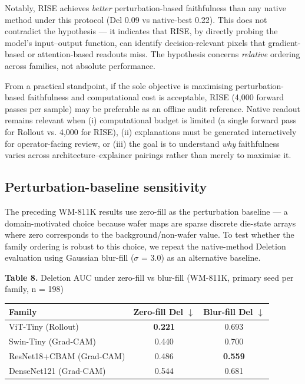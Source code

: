 \documentclass[11pt,a4paper]{article}
\begin{document}
Notably, RISE achieves \emph{better} perturbation-based faithfulness than any native method under this protocol (Del 0.09 vs native-best 0.22). This does not contradict the hypothesis --- it indicates that RISE, by directly probing the model's input--output function, can identify decision-relevant pixels that gradient-based or attention-based readouts miss. The hypothesis concerns \emph{relative} ordering across families, not absolute performance.

From a practical standpoint, if the sole objective is maximising perturbation-based faithfulness and computational cost is acceptable, RISE (4,000 forward passes per sample) may be preferable as an offline audit reference. Native readout remains relevant when (i) computational budget is limited (a single forward pass for Rollout vs. 4,000 for RISE), (ii) explanations must be generated interactively for operator-facing review, or (iii) the goal is to understand \emph{why} faithfulness varies across architecture--explainer pairings rather than merely to maximise it.


\subsection{Perturbation-baseline sensitivity}

The preceding WM-811K results use zero-fill as the perturbation baseline --- a domain-motivated choice because wafer maps are sparse discrete die-state arrays where zero corresponds to the background/non-wafer value. To test whether the family ordering is robust to this choice, we repeat the native-method Deletion evaluation using Gaussian blur-fill ($\sigma$ = 3.0) as an alternative baseline.

\begin{center}
\small \textbf{Table 8.} Deletion AUC under zero-fill vs blur-fill (WM-811K, primary seed per family, n = 198)
\end{center}

\begin{tabular}{lcc}
\toprule
Family & Zero-fill Del $\downarrow$ & Blur-fill Del $\downarrow$ \\
\midrule
ViT-Tiny (Rollout) & \textbf{0.221} & 0.693 \\
Swin-Tiny (Grad-CAM) & 0.440 & 0.700 \\
ResNet18+CBAM (Grad-CAM) & 0.486 & \textbf{0.559} \\
DenseNet121 (Grad-CAM) & 0.544 & 0.681 \\
\bottomrule
\end{tabular}
\end{document}
